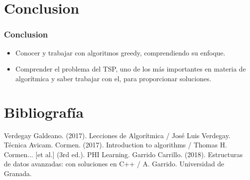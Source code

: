 \documentclass[13pt]{beamer}
\begin{document}
	\section{Conclusion}

    \begin{frame}
		\frametitle{Conclusion}
		\begin{itemize}
			\item Conocer y trabajar con algoritmos greedy, comprendiendo su enfoque.
			\item Comprender el problema del TSP, uno de los más importantes en materia de algorítmica y saber trabajar con el, para proporcionar soluciones.
		\end{itemize}	
	\end{frame}


    \section{Bibliografía}

    \begin{frame}
        \begin{thebibliography}{0}
             Verdegay Galdeano. (2017). Lecciones de Algorítmica / José Luis Verdegay. Técnica Avicam.
             Cormen. (2017). Introduction to algorithms / Thomas H. Cormen... [et al.] (3rd ed.). PHI Learning.
             Garrido Carrillo. (2018). Estructuras de datos avanzadas: con soluciones en C++ / A. Garrido. Universidad de Granada.  
        \end{thebibliography}
    \end{frame}
\end{document}
